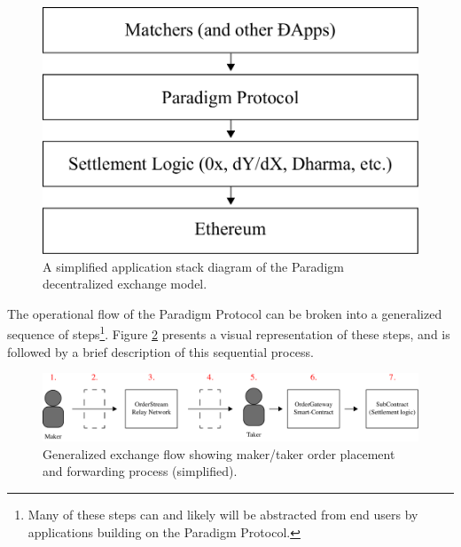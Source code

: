 \documentclass[9pt]{article}
\begin{document}
\begin{figure}[H]
    \centering
    \includegraphics[scale=0.35]{../figures/fig1.pdf}
    \caption{A simplified application stack diagram of the Paradigm decentralized exchange model.}
    \label{fig:fig1}
\end{figure}

\noindent The operational flow of the Paradigm Protocol can be broken into a generalized sequence of steps\footnote{Many of these steps can and likely will be abstracted from end users by applications building on the Paradigm Protocol.}. Figure \ref{fig:fig2} presents a visual representation of these steps, and is followed by a brief description of this sequential process. 

\begin{figure}[H]
    \centering
    \includegraphics[scale=0.5]{../figures/fig2.pdf}
    \caption{Generalized exchange flow showing maker/taker order placement and forwarding process (simplified). }
    \label{fig:fig2}
\end{figure}
\end{document}
